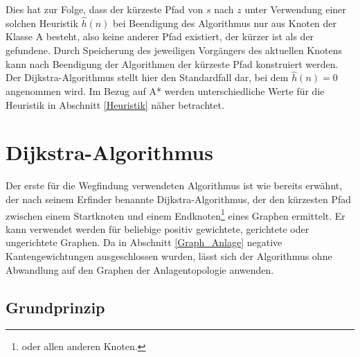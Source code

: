 		Dies hat zur Folge, dass der kürzeste Pfad von $s$ nach $z$ unter Verwendung einer solchen Heuristik $\hat{h}(n)$ bei Beendigung des Algorithmus nur aus Knoten der Klasse A besteht, also keine anderer Pfad existiert, der kürzer ist als der gefundene. Durch Speicherung des jeweiligen Vorgängers des aktuellen Knotens kann nach Beendigung der Algorithmen der kürzeste Pfad konstruiert werden. 
		\\
		Der Dijkstra-Algorithmus stellt hier den Standardfall dar, bei dem $\hat{h}(n)=0$ angenommen wird. Im Bezug auf A* werden unterschiedliche Werte für die Heuristik in Abschnitt \ref{Heuristik} näher betrachtet.
	
\section{Dijkstra-Algorithmus}
	Der erste für die Wegfindung verwendeten Algorithmus ist wie bereits erwähnt, der nach seinem Erfinder benannte Dijkstra-Algorithmus, der den kürzesten Pfad zwischen einem Startknoten und einem Endknoten\footnote{oder allen anderen Knoten.} eines Graphen ermittelt. Er kann verwendet werden für beliebige positiv gewichtete, gerichtete oder ungerichtete Graphen. Da in Abschnitt \ref{Graph_Anlage} negative Kantengewichtungen ausgeschlossen wurden, lässt sich der Algorithmus ohne Abwandlung auf den Graphen der Anlagentopologie anwenden.
	\subsection{Grundprinzip}
		\label{Dijkstra_Alg}
		
